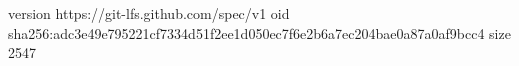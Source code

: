 version https://git-lfs.github.com/spec/v1
oid sha256:adc3e49e795221cf7334d51f2ee1d050ec7f6e2b6a7ec204bae0a87a0af9bcc4
size 2547
